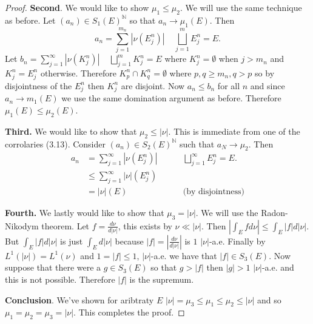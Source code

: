 \documentclass[11pt]{amsart}
\theoremstyle{definition}
\numberwithin{theorem}{section}
\numberwithin{definition}{section}
\numberwithin{equation}{section}
\begin{document}
\begin{proof}
	\textbf{Second}. We would like to show $\mu_1 \leq \mu_2$.  We will use the same technique as before. Let $(a_n) \in S_1(E)^\mathbb{N}$ so that $a_n \to \mu_1(E).$ Then 
	\begin{equation*}
		a_n = \sum_{j=1}^{m_n} \left|\nu (E_j^n)\right|\;\;\;\;\bigsqcup_{j=1}^m E_j^n = E.
	\end{equation*}
	Let $b_n = \sum_{j=1}^{\infty} \left|\nu (K_j^n)\right|\;\;\;\;\bigsqcup_{j=1}^m K_j^n = E$ where $K_j^n = \emptyset$ when
	$j > m_n$ and $K_j^n = E_j^n$ otherwise. Therefore $K_p^n \cap K_q^n = \emptyset$ where $p,q \geq m_n, q > p$ so by disjointness of the $E_j^n$ then $K_j^n$ are disjoint. Now $a_n \leq b_n$ for all $n$ and since $a_n \to m_1(E)$ we use the same domination argument as before. Therefore $\mu_1(E) \leq \mu_2(E).$

	\textbf{Third.} We would like to show that $\mu_2 \leq |\nu|.$ This is immediate from one of the corrolaries (3.13). Consider $(a_n) \in S_2(E)^\mathbb{N}$ such that $a_N \to \mu_2$. Then
	\begin{equation*}
	\begin{aligned}
		a_n &= \sum_{j=1}^{\infty} \left|\nu (E_j^n)\right|\;\;\;\;\;\;\;\;&\bigsqcup_{j=1}^\infty E_j^n = E. \\
			&\leq \sum_{j=1}^{\infty} \left|\nu\right| (E_j^n) \\
			&= |\nu|(E) &\text{(by disjointness)}
	\end{aligned}
	\end{equation*}

	\textbf{Fourth.} We lastly would like to show that $\mu_3 = |\nu|$. We will use the Radon-Nikodym theorem.
	Let $f = \frac{d\nu}{d|\nu|}$, this exists by $\nu \ll |\nu|$. Then $\left|\int_E f d\nu \right| \leq \int_E |f| d|\nu|.$ But $\int_E |f| d|\nu|$ is just $\int_E d|\nu|$ because $|f| = |\frac{d\nu}{d|\nu|}|$ is $1$ $|\nu|$-a.e. Finally by
	$L^1(|\nu|) = L^1(\nu)$ and $1 = |f| \leq 1$, $|\nu|$-a.e. we have that $|f| \in S_3(E).$ Now suppose that there were a $g \in S_3(E)$ so that $g > |f|$ then $|g| > 1$ $|\nu|$-a.e. and this is not possible. Therefore $|f|$ is the supremum.


	\textbf{Conclusion}. We've shown for aribtraty $E$ $|\nu|=\mu_3 \leq \mu_1 \leq \mu_2\leq|\nu|$ and so $\mu_1 = \mu_2 = \mu_3 = |\nu|.$ This completes the proof.


\end{proof}
\end{document}

